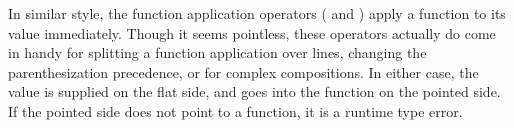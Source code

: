 \begin{prooftree}
\end{prooftree}

In similar style, the function application operators (\op{<|} and \op{|>}) apply
a function to its value immediately. Though it seems pointless, these operators
actually do come in handy for splitting a function application over lines, changing
the parenthesization precedence, or for complex compositions. In either case, the
value is supplied on the flat side, and goes into the function on the pointed side.
If the pointed side does not point to a function, it is a runtime type error.

\begin{prooftree}
\end{prooftree}

\begin{prooftree}
\end{prooftree}
